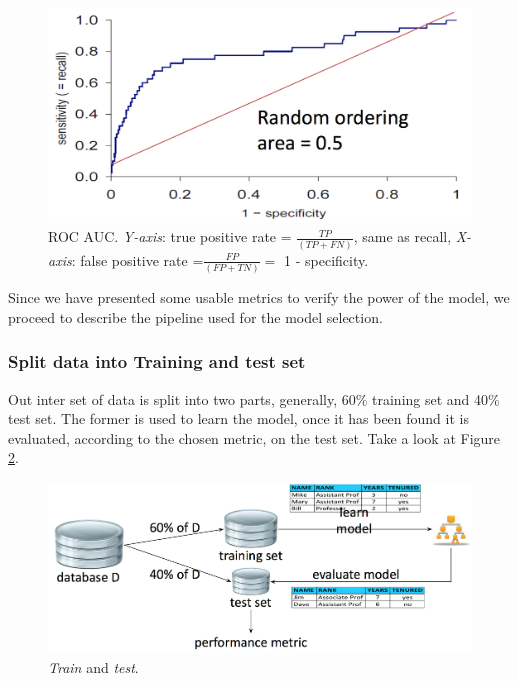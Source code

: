 \begin{figure}[H]%
 \centering
 \includegraphics[width=13cm]{./img/08/roc}
 \caption{\label{pic:roc} ROC AUC. \emph{Y-axis}: true positive rate = $\frac{TP}{(TP + FN)}$, same as recall, \emph{X-axis}: false positive rate =$\frac{FP}{(FP + TN)} =$ 1 - specificity.}
\end{figure}

Since we have presented some usable metrics to verify the power of the model, we proceed to describe the pipeline used for the model selection.

\subsubsection{Split data into Training and test set}

Out inter set of data is split into two parts, generally, 60\% training set and 40\% test set. The former is used to learn the model, once it has been found it is evaluated, according to the chosen metric, on the test set. Take a look at Figure \ref{pic:train_test}.

\begin{figure}[H]%
 \centering
 \includegraphics[width=13cm]{./img/08/train_test}
 \caption{\label{pic:train_test} \emph{Train} and \emph{test}.}
\end{figure}

